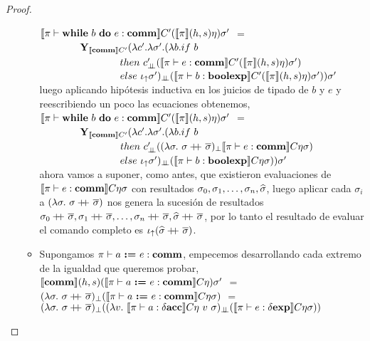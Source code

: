 \begin{proof}
\begin{itemize}
\begin{itemize}
$\llbracket \pi \vdash \textbf{while} \ b \ \textbf{do} \ e : \textbf{comm} \rrbracket C' (\llbracket \pi \rrbracket(h,s)\eta) \sigma'$ $=$ \\
\indent \ \ \ \ \ \ \ \
$\textbf{Y}_{\llbracket \textbf{comm} \rrbracket C'} (\lambda c' . \lambda \sigma' . (\lambda b . if \ b$ \\
\indent \ \ \ \ \ \ \ \ \ \ \ \ \ \ \ \
$then \ c'_{\dbot}(\semBrcks{\pi \vdash e : \commt}C'(\semBrcks{\pi}(h,s)\eta) \sigma')$ \\
\indent \ \ \ \ \ \ \ \ \ \ \ \ \ \ \ \
$else \ \iota_{\uparrow} \sigma')_{\bot \!\!\! \bot} 
	(\llbracket \pi \vdash b : \textbf{boolexp} \rrbracket C'(\llbracket \pi \rrbracket(h,s)\eta)\sigma'))\sigma'$ \\

luego aplicando hip\'otesis inductiva en los juicios de tipado de $b$ y $e$ y reescribiendo
un poco las ecuaciones obtenemos,\\

$\llbracket \pi \vdash \textbf{while} \ b \ \textbf{do} \ e : \textbf{comm} \rrbracket C' (\llbracket \pi \rrbracket(h,s)\eta) \sigma'$ $=$ \\
\indent \ \ \ \ \ \ \ \
$\textbf{Y}_{\llbracket \textbf{comm} \rrbracket C'} (\lambda c' . \lambda \sigma' . (\lambda b . if \ b$ \\
\indent \ \ \ \ \ \ \ \ \ \ \ \ \ \ \ \
$then \ c'_{\bot \!\!\! \bot}((\lambda \sigma. \ \sigma +\kern-1.3ex+\kern0.8ex \overline{\sigma})_{\bot}
					\llbracket \pi \vdash e : \textbf{comm} \rrbracket C \eta \sigma)$ \\
\indent \ \ \ \ \ \ \ \ \ \ \ \ \ \ \ \
$else \ \iota_{\uparrow} \sigma')_{\bot \!\!\! \bot} 
	(\llbracket \pi \vdash b : \textbf{boolexp} \rrbracket C \eta \sigma))\sigma'$ \\
	
ahora vamos a suponer, como antes, que existieron evaluaciones de 
$\llbracket \pi \vdash e : \textbf{comm} \rrbracket C \eta \sigma$
con resultados $\sigma_0, \sigma_1, \ldots, \sigma_n, \widehat{\sigma}$, luego
aplicar cada $\sigma_i$ a $(\lambda \sigma . \ \sigma +\kern-1.3ex+\kern0.8ex \overline{\sigma})$ nos
genera la sucesi\'on de resultados 
$\sigma_0\concat\sigmaover, \sigma_1\concat\sigmaover, \ldots, 
\sigma_n\concat\sigmaover, \sigmahat\concat\sigmaover$, por lo tanto el resultado
de evaluar el comando completo es $\iota_{\uparrow} (\widehat{\sigma}+\kern-1.3ex+\kern0.8ex\overline{\sigma})$.

\item Supongamos $\pi \vdash a \ \textbf{:=} \ e : \textbf{comm}$, empecemos desarrollando cada
extremo de la igualdad que queremos probar,\\

$\llbracket \textbf{comm} \rrbracket(h,s)(\llbracket \pi \vdash a \ \textbf{:=} \ e : \textbf{comm} \rrbracket C\eta)\sigma'$ $=$\\
$(\lambda \sigma. \ \sigma +\kern-1.3ex+\kern0.8ex \overline{\sigma})_{\bot}
				(\llbracket \pi \vdash a \ \textbf{:=} \ e : \textbf{comm} \rrbracket C\eta\sigma)$ $=$\\
$(\lambda \sigma. \ \sigma \concat \sigmaover)_{\bot}(
	(\lambda v. \ \semBrcks{\pi \vdash a : \deltaacc}C\eta \ v \ \sigma)_{\dbot}
	(\semBrcks{\pi \vdash e : \deltaexp}C\eta\sigma))$\\
	

\end{itemize}
\end{itemize}
\end{proof}
